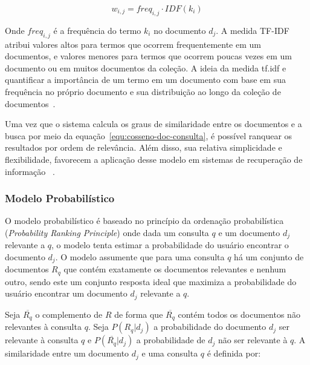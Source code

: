 \begin{equation}
	w_{i,j} = freq_{i,j} \cdot IDF(k_i)
\end{equation}



Onde $freq_{i,j}$ é a frequência do termo $k_i$ no documento $d_j$. A medida TF-IDF atribui valores altos para termos que ocorrem frequentemente em um documentos, e valores menores para termos que ocorrem poucas vezes em um documento ou em muitos documentos da coleção. A ideia da medida tf.idf e quantificar a importância de um termo em um documento com base em sua frequência no próprio documento e sua distribuição ao longo da coleção de documentos~\cite{Croft2009,Salton1988,Shamsinejadbabki2012,Salton:1994}.


Uma vez que o sistema calcula os graus de similaridade entre os documentos e a busca por meio da equação~\ref{equ:cosseno-doc-consulta}, é possível ranquear os resultados por ordem de relevância. Além disso, sua relativa simplicidade e flexibilidade, favorecem a aplicação desse modelo em sistemas de recuperação de informação
~\cite{Tan2005,Croft2009,Manning2008}.



\subsubsection{Modelo Probabilístico}

 
O modelo probabilístico é baseado no princípio da ordenação probabilística (\textit{Probability Ranking Principle}) onde dada um consulta $q$ e um documento $d_j$ relevante a $q$, o modelo tenta estimar a probabilidade do usuário encontrar o documento $d_j$. O modelo assumente que para uma consulta $q$ há um conjunto de documentos $R_q$ que contém exatamente os documentos relevantes e nenhum outro, sendo este um conjunto resposta ideal que maximiza a probabilidade do usuário encontrar um documento $d_j$ relevante a $q$. 

Seja $\overline{R_q}$ o complemento de $R$ de forma que $\overline{R_q}$ contém todos os documentos não relevantes à consulta $q$. Seja $P(R_q|d_j)$ a probabilidade do documento $d_j$ ser relevante à consulta $q$ e $P(\overline{R_q}|d_j)$ a probabilidade de $d_j$ não ser relevante à $q$. A similaridade entre um documento $d_j$ e uma consulta $q$ é definida por:





